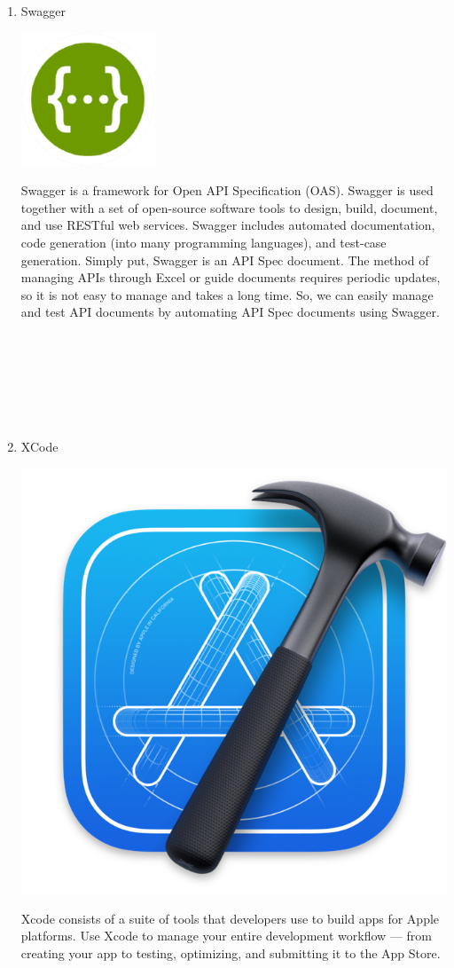\documentclass[conference]{IEEEtran}
\begin{document}
\begin{enumerate}
    \item Swagger \\ 
    \centerline{\includegraphics{assets/Swagger.png}}
    Swagger is a framework for Open API Specification (OAS). Swagger is used together with a set of open-source software tools to design, build, document, and use RESTful web services. Swagger includes automated documentation, code generation (into many programming languages), and test-case generation. Simply put, Swagger is an API Spec document. The method of managing APIs through Excel or guide documents requires periodic updates, so it is not easy to manage and takes a long time. So, we can easily manage and test API documents by automating API Spec documents using Swagger. \\ \\ \\ \\ \\ \\ \\

    \item XCode \\ 
    \centerline{\includegraphics[scale=0.3]{assets/xcode.png}}
    Xcode consists of a suite of tools that developers use to build apps for Apple platforms. Use Xcode to manage your entire development workflow — from creating your app to testing, optimizing, and submitting it to the App Store.


\end{enumerate}
\end{document}
